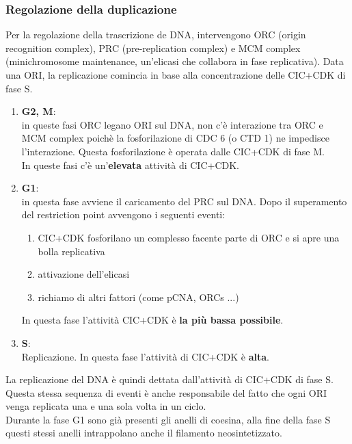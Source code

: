         \subsubsection{Regolazione della duplicazione}
            Per la regolazione della trascrizione de DNA, intervengono ORC (origin recognition complex), PRC (pre-replication complex) e MCM complex (minichromosome maintenance, un'elicasi che collabora in fase replicativa). Data una ORI, la replicazione comincia in base alla concentrazione delle CIC+CDK di fase S.
            \begin{enumerate}
                \item \textbf{G2, M}:\\
                in queste fasi ORC legano ORI sul DNA, non c'è interazione tra ORC e MCM complex poichè la fosforilazione di CDC 6 (o CTD 1) ne impedisce l'interazione. 
                Questa fosforilazione è operata dalle CIC+CDK di fase M.\\
                In queste fasi c'è un'\textbf{elevata} attività di CIC+CDK.
                \item \textbf{G1}:\\
                in questa fase avviene il caricamento del PRC sul DNA. Dopo il superamento del restriction point avvengono i seguenti eventi:
                \begin{enumerate}
                    \item CIC+CDK fosforilano un complesso facente parte di ORC e si apre una bolla replicativa
                    \item attivazione dell'elicasi
                    \item richiamo di altri fattori (come pCNA, ORCs ...)
                \end{enumerate}
                In questa fase l'attività CIC+CDK è \textbf{la più bassa possibile}.
                \item \textbf{S}:\\
                Replicazione. In questa fase l'attività di CIC+CDK è \textbf{alta}.
            \end{enumerate}
            La replicazione del DNA è quindi dettata dall'attività di CIC+CDK di fase S.\\
            Questa stessa sequenza di eventi è anche responsabile del fatto che ogni ORI venga replicata una e una sola volta in un ciclo.\\
            Durante la fase G1 sono già presenti gli anelli di coesina, alla fine della fase S questi stessi anelli intrappolano anche il filamento neosintetizzato.
            
